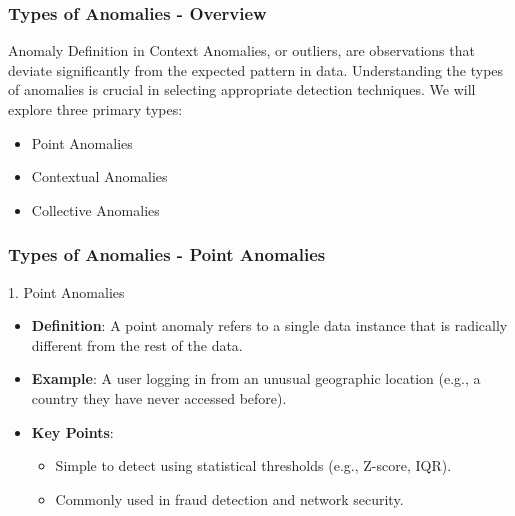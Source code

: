 \documentclass{beamer}
\begin{document}
\begin{frame}[fragile]
    \frametitle{Types of Anomalies - Overview}
    \begin{block}{Anomaly Definition in Context}
        Anomalies, or outliers, are observations that deviate significantly from the expected pattern in data. Understanding the types of anomalies is crucial in selecting appropriate detection techniques. We will explore three primary types:
        \begin{itemize}
            \item Point Anomalies
            \item Contextual Anomalies
            \item Collective Anomalies
        \end{itemize}
    \end{block}
\end{frame}

\begin{frame}[fragile]
    \frametitle{Types of Anomalies - Point Anomalies}
    \begin{block}{1. Point Anomalies}
        \begin{itemize}
            \item \textbf{Definition}: A point anomaly refers to a single data instance that is radically different from the rest of the data.
            \item \textbf{Example}: A user logging in from an unusual geographic location (e.g., a country they have never accessed before).
            \item \textbf{Key Points}:
            \begin{itemize}
                \item Simple to detect using statistical thresholds (e.g., Z-score, IQR).
                \item Commonly used in fraud detection and network security.
            \end{itemize}
        \end{itemize}
    \end{block}
\end{frame}
\end{document}

